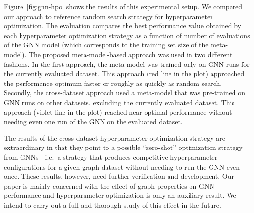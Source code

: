 Figure~\ref{fig:gnn-hpo} shows the results of this experimental setup. We compared our approach to reference random search strategy for hyperparameter optimization. The evaluation compares the best performance value obtained by each hyperparameter optimization strategy as a function of number of evaluations of the GNN model (which corresponds to the training set size of the meta-model). The proposed meta-model-based approach was used in two different fashions. In the first approach, the meta-model was trained only on GNN runs for the currently evaluated dataset. This approach (red line in the plot) approached the performance optimum faster or roughly as quickly as random search. Secondly, the cross-dataset approach used a meta-model that was pre-trained on GNN runs on other datasets, excluding the currently evaluated dataset. This approach (violet line in the plot) reached near-optimal performance without needing even one run of the GNN on the evaluated dataset.

The results of the cross-dataset hyperparameter optimization strategy are extraordinary in that they point to a possible \enquote{zero-shot} optimization strategy from GNNs - i.e.\ a strategy that produces competitive hyperparameter configurations for a given graph dataset without needing to run the GNN even once. These results, however, need further verification and development. Our paper \cite{prochazka_which_2023} is mainly concerned with the effect of graph properties on GNN performance and hyperparameter optimization is only an auxiliary result. We intend to carry out a full and thorough study of this effect in the future.
